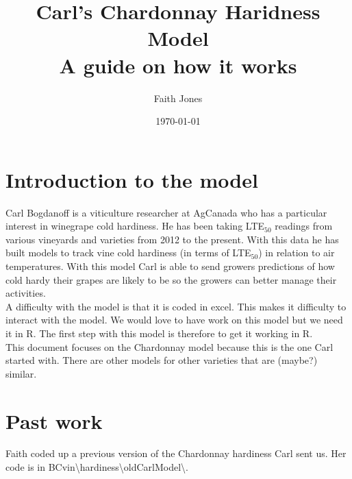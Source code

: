 \documentclass[11pt,letter]{article}
\title{Carl's Chardonnay Haridness Model \\ A guide on how it works }
\date{\today}
\author{Faith Jones}
\begin{document}
\renewcommand{\bibname}{References}%

\maketitle
\tableofcontents

\section{Introduction to the model}

Carl Bogdanoff is a viticulture researcher at AgCanada who has a particular interest in winegrape cold hardiness. He has been taking LTE$_{50}$ readings from various vineyards and varieties from 2012 to the present. With this data he has built models to track vine cold hardiness (in terms of LTE$_{50}$) in relation to air temperatures. With this model Carl is able to send growers predictions of how cold hardy their grapes are likely to be so the growers can better manage their activities. \\

A difficulty with the model is that it is coded in excel. This makes it difficulty to interact with the model. We would love to have work on this model but we need it in R. The first step with this model is therefore to get it working in R.\\

This document focuses on the Chardonnay model because this is the one Carl started with. There are other models for other varieties that are (maybe?) similar. \\ 

\section{Past work}
Faith coded up a previous version of the Chardonnay hardiness Carl sent us. Her code is in BCvin\textbackslash hardiness\textbackslash oldCarlModel\textbackslash. 
\end{document}
